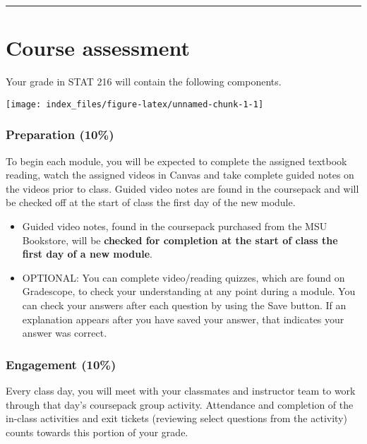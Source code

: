 \documentclass[
]{article}
\providecommand{\tightlist}{%
  \setlength{\itemsep}{0pt}\setlength{\parskip}{0pt}}
\begin{document}
\begin{center}\rule{0.5\linewidth}{0.5pt}\end{center}

\section{Course assessment}\label{course-assessment}

Your grade in STAT 216 will contain the following components.

\begin{center}\texttt{[image: index\_files/figure-latex/unnamed-chunk-1-1]} \end{center}

\subsubsection{Preparation (10\%)}\label{preparation-10}

To begin each module, you will be expected to complete the assigned
textbook reading, watch the assigned videos in Canvas and take complete
guided notes on the videos prior to class. Guided video notes are found
in the coursepack and will be checked off at the start of class the
first day of the new module.

\begin{itemize}
\tightlist
\item
  Guided video notes, found in the coursepack purchased from the MSU
  Bookstore, will be \textbf{checked for completion at the start of
  class the first day of a new module}.
\item
  OPTIONAL: You can complete video/reading quizzes, which are found on
  Gradescope, to check your understanding at any point during a module.
  You can check your answers after each question by using the Save
  button. If an explanation appears after you have saved your answer,
  that indicates your answer was correct.
\end{itemize}

\subsubsection{Engagement (10\%)}\label{engagement-10}

Every class day, you will meet with your classmates and instructor team
to work through that day's coursepack group activity. Attendance and
completion of the in-class activities and exit tickets (reviewing select
questions from the activity) counts towards this portion of your grade.
\end{document}
